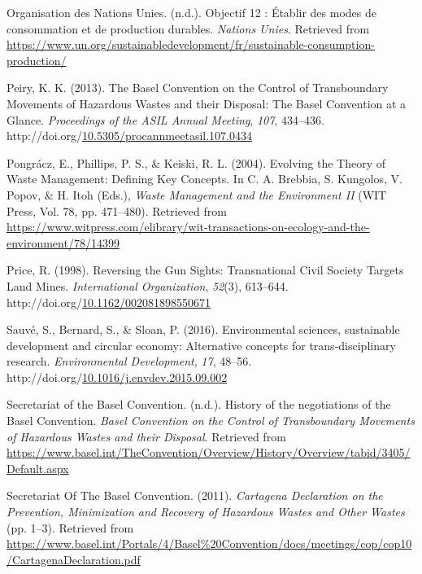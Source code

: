 \documentclass[12pt]{ulaval}
\newenvironment{CSLReferences}%
  {}%
  {\par}
\begin{document}
\begin{CSLReferences}{1}{0}
Organisation des Nations Unies. (n.d.). Objectif 12 : Établir des modes de consommation et de production durables. \emph{Nations Unies}. Retrieved from \url{https://www.un.org/sustainabledevelopment/fr/sustainable-consumption-production/}

Peiry, K. K. (2013). The {Basel} {Convention} on the {Control} of {Transboundary} {Movements} of {Hazardous} {Wastes} and their {Disposal}: {The} {Basel} {Convention} at a {Glance}. \emph{Proceedings of the ASIL Annual Meeting}, \emph{107}, 434--436. http://doi.org/\href{https://doi.org/10.5305/procannmeetasil.107.0434}{10.5305/procannmeetasil.107.0434}

Pongrácz, E., Phillips, P. S., \& Keiski, R. L. (2004). Evolving the {Theory} of {Waste} {Management}: {Defining} {Key} {Concepts}. In C. A. Brebbia, S. Kungolos, V. Popov, \& H. Itoh (Eds.), \emph{Waste {Management} and the {Environment} {II}} (WIT Press, Vol. 78, pp. 471--480). Retrieved from \url{https://www.witpress.com/elibrary/wit-transactions-on-ecology-and-the-environment/78/14399}

Price, R. (1998). Reversing the {Gun} {Sights}: {Transnational} {Civil} {Society} {Targets} {Land} {Mines}. \emph{International Organization}, \emph{52}(3), 613--644. http://doi.org/\href{https://doi.org/10.1162/002081898550671}{10.1162/002081898550671}

Sauvé, S., Bernard, S., \& Sloan, P. (2016). Environmental sciences, sustainable development and circular economy: {Alternative} concepts for trans-disciplinary research. \emph{Environmental Development}, \emph{17}, 48--56. http://doi.org/\href{https://doi.org/10.1016/j.envdev.2015.09.002}{10.1016/j.envdev.2015.09.002}

Secretariat of the Basel Convention. (n.d.). History of the negotiations of the {Basel} {Convention}. \emph{Basel Convention on the Control of Transboundary Movements of Hazardous Wastes and their Disposal}. Retrieved from \url{https://www.basel.int/TheConvention/Overview/History/Overview/tabid/3405/Default.aspx}

Secretariat Of The Basel Convention. (2011). \emph{Cartagena {Declaration} on the {Prevention}, {Minimization} and {Recovery} of {Hazardous} {Wastes} and {Other} {Wastes}} (pp. 1--3). Retrieved from \url{https://www.basel.int/Portals/4/Basel\%20Convention/docs/meetings/cop/cop10/CartagenaDeclaration.pdf}


\end{CSLReferences}
\end{document}
